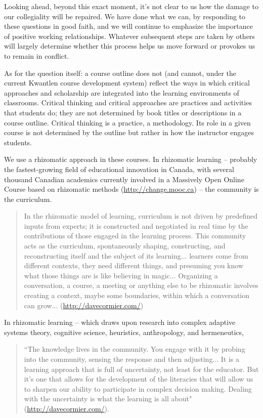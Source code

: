 \documentclass[letterpaper,10pt,headsepline]{scrreprt}
\begin{document}
Looking ahead, beyond this exact moment, it's not clear to us how the damage to our collegiality will be repaired. We have done what we can, by responding to these questions in good faith, and we will continue to emphasize the importance of positive working relationships. Whatever subsequent steps are taken by others will largely determine whether this process helps us move forward or provokes us to remain in conflict.

As for the question itself: a course outline does not (and cannot, under the current Kwantlen course development system) reflect the ways in which critical approaches and scholarship are integrated into the learning environments of classrooms. Critical thinking and critical approaches are practices and activities that students do; they are not  determined by book titles or descriptions in a course outline. Critical thinking is a practice, a methodology. Its role in a given course is not determined by the outline but rather in how the instructor engages students.

We use a rhizomatic approach in these courses. In rhizomatic learning -- probably the fastest-growing field of educational innovation in Canada, with several thousand Canadian academics currently involved in a Massively Open Online Course based on rhizomatic methods (\url{http://change.mooc.ca}) -- the community is the curriculum.

\begin{quote}
In the rhizomatic model of learning, curriculum is not driven by predefined inputs from experts; it is constructed and negotiated in real time by the contributions of those engaged in the learning process. This community acts as the curriculum, spontaneously shaping, constructing, and reconstructing itself and the subject of its learning... learners come from different contexts, they need different things, and presuming you know what those things are is like believing in magic... Organizing a conversation, a course, a meeting or anything else to be rhizomatic involves creating a context, maybe some boundaries, within which a conversation can grow... (\url{http://davecormier.com/})
\end{quote}

In rhizomatic learning -- which draws upon research into complex adaptive systems theory, cognitive science, heuristics, anthropology, and hermeneutics,

\begin{quote}
 ``The knowledge lives in the community. You engage with it by probing into the community, sensing the response and then adjusting... It is a learning approach that is full of uncertainty, not least for the educator. But it's one that allows for the development of the literacies that will allow us to sharpen our ability to participate in complex decision making. Dealing with the uncertainty is what the learning is all about"  (\url{http://davecormier.com/}).
\end{quote}
\end{document}
